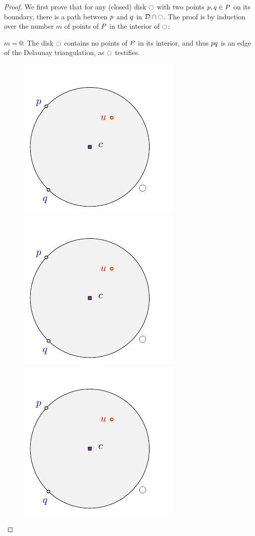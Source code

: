 \documentclass[12pt]{article}%
\begin{document}
\begin{proof}
    We first prove that for any (closed) disk $\ocircle$ with two points
    $p,q\in P$ on its boundary, there is a path between $p$
    and $q$ in $\mathcal{D} \cap {\ocircle}$.  The proof is by induction
    over the number $m$ of points of $P$ in the interior of $\ocircle$:
    \begin{compactitem}
        \item $m=0$: The disk $\ocircle$ contains no points of $P$ in
        its interior, and thus $p q$ is an edge of the Delaunay
        triangulation, as $\ocircle$ testifies.

        \begin{figure}[h]
            \phantom{}\hfill%
            \includegraphics[page=1]{figs/shrink}%
            \hfill%
            \includegraphics[page=2]{figs/shrink}%
            \hfill%
            \includegraphics[page=3]{figs/shrink}%

\end{figure}
\end{compactitem}
\end{proof}
\end{document}
